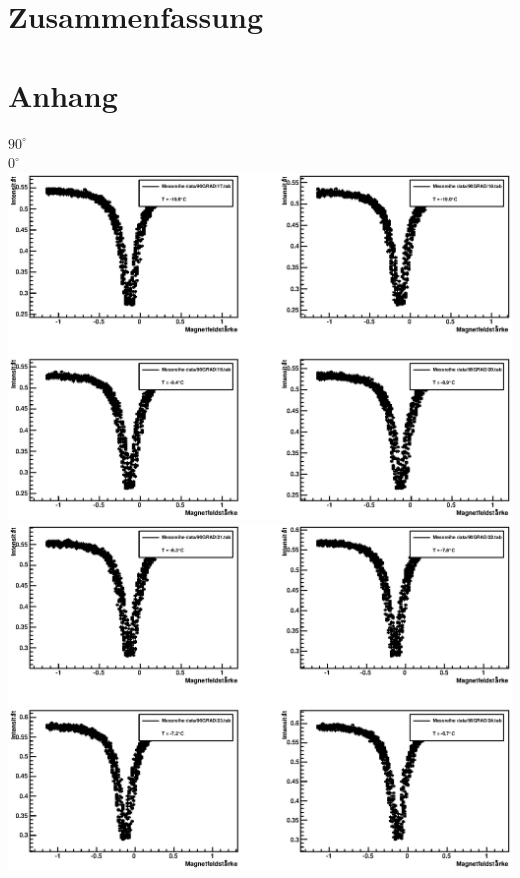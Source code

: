 \documentclass[12pt]{article}
\begin{document}
\section{Zusammenfassung}
\section{Anhang}
\singlespacing
\centering
\textbf{$90^\circ$} \\

\newpage
\textbf{$0^\circ$} \\

\newpage
\includegraphics[width=1\linewidth]{pictures/1.eps} \\
\includegraphics[width=1\linewidth]{pictures/2.eps} \\
\end{document}

